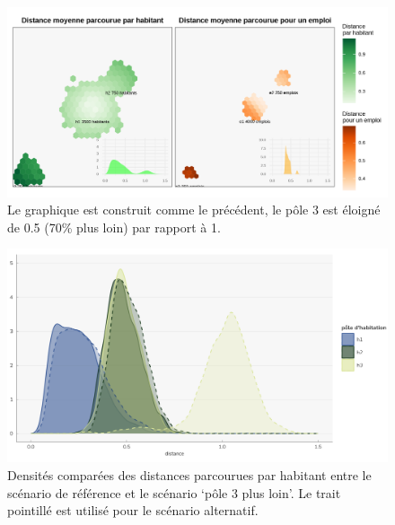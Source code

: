 \documentclass[
  10pt,
  a4paper,
  numbers=noendperiod,
  DIV=9]{scrreprt}
\begin{document}
\begin{figure}[htb]

{\centering \includegraphics[width=1\textwidth,height=\textheight]{./output/gdistances2.png}

}

\caption[Distances moyenne par habitant et pour un emploi (3
éloigné)]{\label{fig-distances2}Le graphique est construit comme le
précédent, le pôle 3 est éloigné de 0.5 (70\% plus loin) par rapport à
1.}

\end{figure}

\begin{figure}[htb]

{\centering \includegraphics[width=1\textwidth,height=\textheight]{./output/gdenshabg.png}

}

\caption[Densités comparées]{\label{fig-denscomp}Densités comparées des
distances parcourues par habitant entre le scénario de référence et le
scénario `pôle 3 plus loin'. Le trait pointillé est utilisé pour le
scénario alternatif.}

\end{figure}
\end{document}
